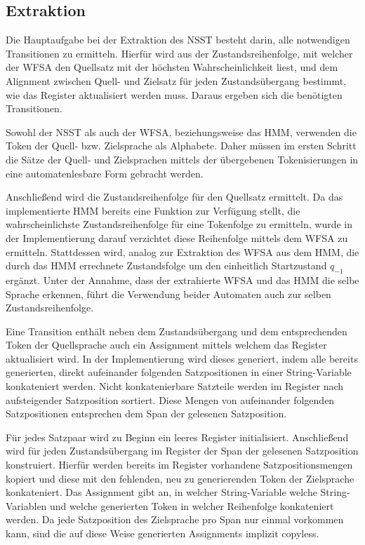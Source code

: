 \documentclass[conference]{IEEEtran}
\begin{document}
\subsection{Extraktion}
Die Hauptaufgabe bei der Extraktion des NSST besteht darin, alle notwendigen Transitionen zu ermitteln.
Hierfür wird aus der Zustandsreihenfolge, mit welcher der WFSA den Quellsatz mit der höchsten Wahrscheinlichkeit liest, 
und dem Alignment zwischen Quell- und Zielsatz für jeden Zustandsübergang bestimmt, wie das Register aktualisiert werden muss.
Daraus ergeben sich die benötigten Transitionen.

Sowohl der NSST als auch der WFSA, beziehungsweise das HMM, verwenden die Token der Quell- bzw. Zielsprache als Alphabete.
Daher müssen im ersten Schritt die Sätze der Quell- und Zielsprachen mittels der übergebenen Tokenisierungen in eine automatenlesbare Form gebracht werden.
 
Anschließend wird die Zustandsreihenfolge für den Quellsatz ermittelt.
Da das implementierte HMM bereits eine Funktion zur Verfügung stellt, die wahrscheinlichste Zustandsreihenfolge für eine Tokenfolge zu ermitteln, wurde in der Implementierung darauf verzichtet diese Reihenfolge mittels dem WFSA zu ermitteln.
Stattdessen wird, analog zur Extraktion des WFSA aus dem HMM, die durch das HMM errechnete Zustandsfolge um den einheitlich Startzustand $q_{-1}$ ergänzt.
Unter der Annahme, dass der extrahierte WFSA und das HMM die selbe Sprache erkennen, führt die Verwendung beider Automaten auch zur selben Zustandsreihenfolge.

Eine Transition enthält neben dem Zustandsübergang und dem entsprechenden Token der Quellsprache auch ein Assignment mittels welchem das Register aktualisiert wird.
In der Implementierung wird dieses generiert, indem alle bereits generierten, direkt aufeinander folgenden Satzpositionen in einer String-Variable konkateniert werden.
Nicht konkatenierbare Satzteile werden im Register nach aufsteigender Satzposition sortiert.
Diese Mengen von aufeinander folgenden Satzpositionen entsprechen dem Span der gelesenen Satzposition.

Für jedes Satzpaar wird zu Beginn ein leeres Register initialisiert.
Anschließend wird für jeden Zustandsübergang im Register der Span der gelesenen Satzposition konstruiert.
Hierfür werden bereits im Register vorhandene Satzpositionsmengen kopiert und diese mit den fehlenden, neu zu generierenden Token der Zielsprache konkateniert.
Das Assignment gibt an, in welcher String-Variable welche String-Variablen und welche generierten Token in welcher Reihenfolge konkateniert werden.
Da jede Satzposition des Zielsprache pro Span nur einmal vorkommen kann, sind die auf diese Weise generierten Assignments implizit copyless.
\end{document}
